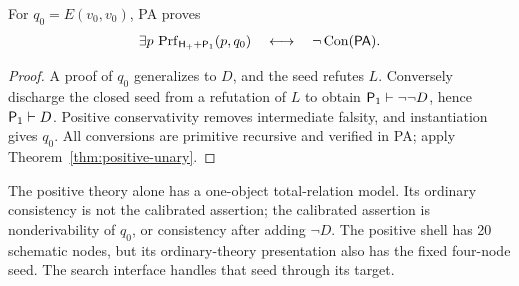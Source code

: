 \begin{corollary}\label{cor:positive-target}
For $q_0=E(v_0,v_0)$, PA proves
\[
  \exists p\,\operatorname{Prf}_{\mathsf H_++\mathsf{P}_{1}}(p,q_0)
      \quad\longleftrightarrow\quad\neg\operatorname{Con}(\mathsf{PA}).
\]
\end{corollary}
\begin{proof}
A proof of $q_0$ generalizes to $D$, and the seed refutes $L$. Conversely discharge the closed seed from a refutation of $L$ to obtain $\mathsf{P}_{1}\vdash\neg\neg D$, hence $\mathsf{P}_{1}\vdash D$. Positive conservativity removes intermediate falsity, and instantiation gives $q_0$. All conversions are primitive recursive and verified in PA; apply Theorem~\ref{thm:positive-unary}.
\end{proof}

The positive theory alone has a one-object total-relation model. Its ordinary consistency is not the calibrated assertion; the calibrated assertion is nonderivability of $q_0$, or consistency after adding $\neg D$. The positive shell has 20 schematic nodes, but its ordinary-theory presentation also has the fixed four-node seed. The search interface handles that seed through its target.
